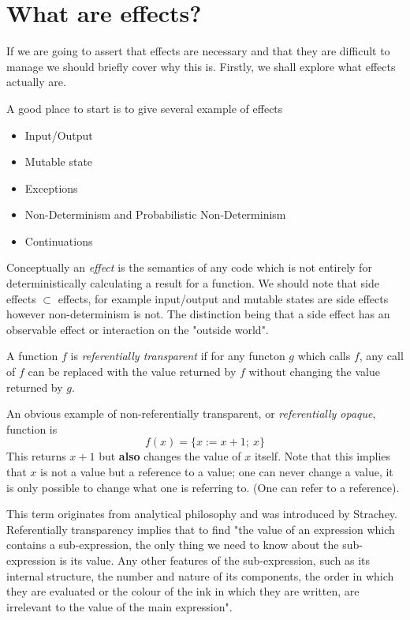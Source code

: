 \section{What are effects?}
If we are going to assert that effects are necessary
and that they are difficult to manage we should
briefly cover why this is.
Firstly, we shall explore what effects actually are.\\

\begin{example}
    A good place to start is to give several example of effects
    \begin{itemize}
        \item Input/Output
        \item Mutable state
        \item Exceptions
        \item Non-Determinism and Probabilistic Non-Determinism
        \item Continuations
    \end{itemize}
\end{example}

Conceptually an \textit{effect} is the semantics of any code
which is not entirely for deterministically calculating a result for a function.
We should note that side effects $\subset$ effects,
for example input/output and mutable states are side effects
however non-determinism is not.
The distinction being that a side effect
has an observable effect or interaction on the "outside world".\\

\begin{definition}
    A function $f$ is \textit{referentially transparent} if
    for any functon $g$ which calls $f$,
    any call of $f$ can be replaced with the value returned by $f$
    without changing the value returned by $g$.

    An obvious example of non-referentially transparent,
    or \textit{referentially opaque}, function is
    \begin{equation}
        f(x) = \{x := x + 1;\ x\}
    \end{equation}
    This returns $x + 1$ but \textbf{also} changes the value of $x$ itself.
    Note that this implies that $x$ is not a value but a reference to a value;
    one can never change a value, it is only possible to change
    what one is referring to. (One can refer to a reference).

    This term originates from analytical philosophy
    and was introduced by Strachey.
    Referentially transparency implies that to find
    "the value of an expression which contains a sub-expression,
    the only thing we need to know about the sub-expression is its value.
    Any other features of the sub-expression,
    such as its internal structure,
    the number and nature of its components,
    the order in which they are evaluated or
    the colour of the ink in which they are written,
    are irrelevant to the value of the main expression"\cite{strachey2000fundamental}.\\
\end{definition}

